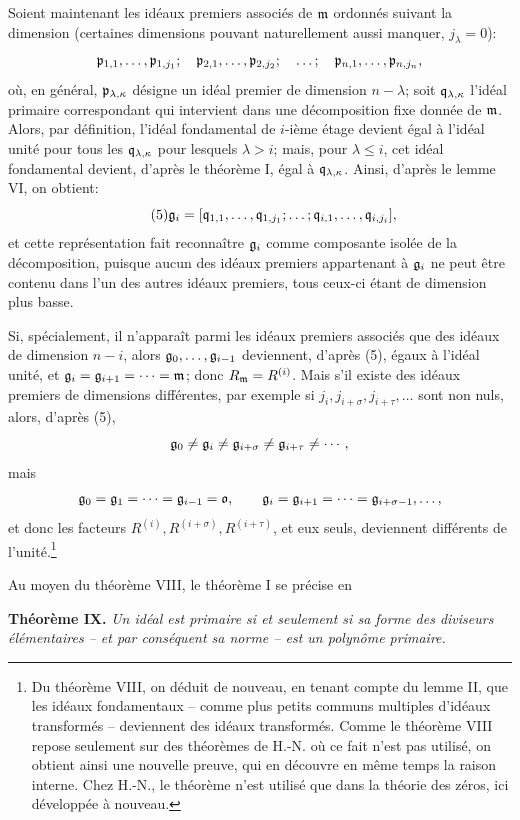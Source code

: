 Soient maintenant les idéaux premiers associés de $\mathfrak m$ ordonnés suivant la dimension (certaines dimensions pouvant naturellement aussi manquer, $j_\lambda=0$):
\[
 \mathfrak p_{1,1},\ldots,\mathfrak p_{1,j_1};\quad
 \mathfrak p_{2,1},\ldots,\mathfrak p_{2,j_2};\quad\ldots;\quad
 \mathfrak p_{n,1},\ldots,\mathfrak p_{n,j_n},
\]
où, en général, $\mathfrak p_{\lambda,\kappa}$ désigne un idéal premier de dimension $n-\lambda$; soit $\mathfrak q_{\lambda,\kappa}$ l'idéal primaire correspondant qui intervient dans une décomposition fixe donnée de $\mathfrak m$. Alors, par définition, l'idéal fondamental de $i$-ième étage devient égal à l'idéal unité pour tous les $\mathfrak q_{\lambda,\kappa}$ pour lesquels $\lambda>i$; mais, pour $\lambda\le i$, cet idéal fondamental devient, d'après le théorème I, égal à $\mathfrak q_{\lambda,\kappa}$. Ainsi, d'après le lemme VI, on obtient:
\[
 \tag{5}
 \mathfrak g_i=[\mathfrak q_{1,1},\ldots,\mathfrak q_{1,j_1};\ldots;\mathfrak q_{i,1},\ldots,\mathfrak q_{i,j_i}],
\]
et cette représentation fait reconnaître $\mathfrak g_i$ comme composante isolée de la décomposition, puisque aucun des idéaux premiers appartenant à $\mathfrak g_i$ ne peut être contenu dans l'un des autres idéaux premiers, tous ceux-ci étant de dimension plus basse.

Si, spécialement, il n'apparaît parmi les idéaux premiers associés que des idéaux de dimension $n-i$, alors $\mathfrak g_0,\ldots,\mathfrak g_{i-1}$ deviennent, d'après (5), égaux à l'idéal unité, et $\mathfrak g_i=\mathfrak g_{i+1}=\cdots=\mathfrak m$; donc $R_\mathfrak m=R^{(i)}$. Mais s'il existe des idéaux premiers de dimensions différentes, par exemple si $j_i,j_{i+\sigma},j_{i+\tau},\ldots$ sont non nuls, alors, d'après (5),
\[
 \mathfrak g_0\ne\mathfrak g_i\ne\mathfrak g_{i+\sigma}\ne\mathfrak g_{i+\tau}\ne\cdots,
\]
mais
\[
 \mathfrak g_0=\mathfrak g_1=\cdots=\mathfrak g_{i-1}=\mathfrak o,
 \qquad
 \mathfrak g_i=\mathfrak g_{i+1}=\cdots=\mathfrak g_{i+\sigma-1},\ldots,
\]
et donc les facteurs $R^{(i)},R^{(i+\sigma)},R^{(i+\tau)}$, et eux seuls, deviennent différents de l'unité.\footnote{Du théorème VIII, on déduit de nouveau, en tenant compte du lemme II, que les idéaux fondamentaux -- comme plus petits communs multiples d'idéaux transformés -- deviennent des idéaux transformés. Comme le théorème VIII repose seulement sur des théorèmes de H.-N. où ce fait n'est pas utilisé, on obtient ainsi une nouvelle preuve, qui en découvre en même temps la raison interne. Chez H.-N., le théorème n'est utilisé que dans la théorie des zéros, ici développée à nouveau.}

Au moyen du théorème VIII, le théorème I se précise en

\textbf{Théorème IX.} \emph{Un idéal est primaire si et seulement si sa forme des diviseurs élémentaires -- et par conséquent sa norme -- est un polynôme primaire.}

